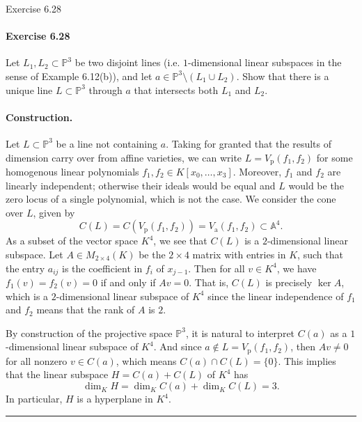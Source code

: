 \documentclass[12pt]{article}
\newenvironment{fullbox}{\begin{lrbox}{\savefullbox}\begin{minipage}{\dimexpr\textwidth-2\fboxsep\relax}}{\end{minipage}\end{lrbox}\begin{center}\framebox[\textwidth]{\usebox{\savefullbox}}\end{center}}
\newenvironment{pbox}[1][]{\begin{fullbox}\ifx#1\empty\else\paragraph{#1}\fi}{\end{fullbox}}
\newcommand{\<}{\langle}
\renewcommand{\>}{\rangle}
\newcommand{\A}{\mathbb{A}}
\renewcommand{\P}{\mathbb{P}}
\newcommand{\Vp}{V_{\mathrm{p}}}
\newcommand{\Va}{V_{\mathrm{a}}}
\newcommand{\Kx}[2]{K[x_{#1}, \dots, x_{#2}]}
\newcommand{\sepline}{\rule{\textwidth}{0.4pt}}
\begin{document}
\thispagestyle{title}


\begin{pbox}[Exercise 6.28]
    Let $L_1, L_2 \subset \P^3$ be two disjoint lines (i.e. $1$-dimensional linear subspaces in the sense of Example 6.12(b)), and let $a \in \P^3 \setminus (L_1 \cup L_2)$. Show that there is a unique line $L \subset \P^3$ through $a$ that intersects both $L_1$ and $L_2$.
\end{pbox}

\paragraph{Construction.} Let $L \subset \P^3$ be a line not containing $a$. Taking for granted that the results of dimension carry over from affine varieties, we can write $L = \Vp(f_1, f_2)$ for some homogenous linear polynomials $f_1, f_2 \in \Kx{0}{3}$. Moreover, $f_1$ and $f_2$ are linearly independent; otherwise their ideals would be equal and $L$ would be the zero locus of a single polynomial, which is not the case. We consider the cone over $L$, given by
\[
    C(L) = C(\Vp(f_1, f_2)) = \Va(f_1, f_2) \subset \A^4.
\]
As a subset of the vector space $K^4$, we see that $C(L)$ is a $2$-dimensional linear subspace. Let $A \in M_{2 \times 4}(K)$ be the $2 \times 4$ matrix with entries in $K$, such that the entry $a_{ij}$ is the coefficient in $f_i$ of $x_{j-1}$. Then for all $v \in K^4$, we have $f_1(v) = f_2(v) = 0$ if and only if $Av = 0$. That is, $C(L)$ is precisely $\ker A$, which is a $2$-dimensional linear subspace of $K^4$ since the linear independence of $f_1$ and $f_2$ means  that the rank of $A$ is $2$.

By construction of the projective space $\P^3$, it is natural to interpret $C(a)$ as a $1$-dimensional linear subspace of $K^4$. And since $a \notin L = \Vp(f_1, f_2)$, then $Av \ne 0$ for all nonzero $v \in C(a)$, which means $C(a) \cap C(L) = \{0\}$. This implies that the linear subspace $H = C(a) + C(L)$ of $K^4$ has
\[
    \dim_K H = \dim_K C(a) + \dim_K C(L) = 3.
\]
In particular, $H$ is a hyperplane in $K^4$.

\sepline
\end{document}
